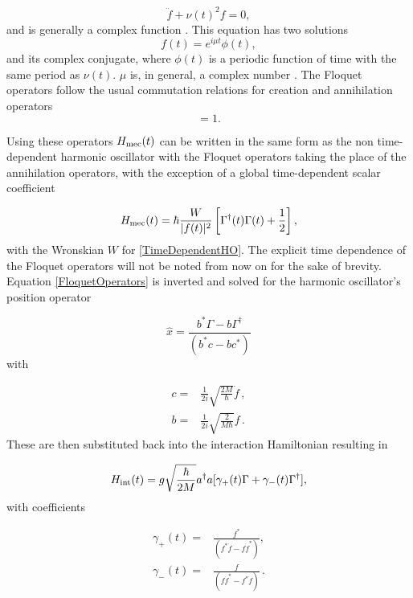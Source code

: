 \documentclass[reprint, amsmath,amssymb, aps,pra]{revtex4-1}
\begin{document}
\begin{equation} \label{TimeDependentHO}
\ddot{f} + \nu(t)^2f=0,
\end{equation} and is generally a complex function \cite{BrownPT}. This equation has two solutions \cite{HanngiFM} 
\begin{equation}
f(t) = e^{i\mu t}\phi(t), 
\end{equation}
and its complex conjugate, where $\phi(t)$ is a periodic function of
time with the same period as $\nu(t)$. $\mu$ is, in general, a complex
number \cite{WardFT}. The Floquet operators follow the usual
commutation relations for creation and annihilation operators
\begin{equation}
[\Gamma(t)^\dagger,\Gamma(t)]=1.
\end{equation}

 Using these operators $H_{\rm mec}(t)$ can be written in the same form as the non time-dependent harmonic oscillator with the Floquet operators taking the place of the annihilation operators, with the exception of a global time-dependent scalar coefficient  \cite{BrownPT}

\begin{equation}
H_{\rm mec}(t) = \hbar\frac{W}{|f(t)|^2}\left[\Gamma^\dagger(t)\Gamma(t) + \frac{1}{2}\right],
\end{equation}
with the Wronskian $W$ for \eqref{TimeDependentHO}. The explicit time dependence of the Floquet operators will not be noted from now on for the sake of brevity. Equation
\eqref{FloquetOperators} is inverted and solved for the harmonic
oscillator's position operator \cite{TesisMaestria}

\begin{equation}
\hat{x} = \frac{b^* \Gamma - b\Gamma^\dagger}{(b^*c-bc^*)}
\end{equation} with

\begin{align}
c =&  \frac{1}{2i}\sqrt{\frac{2M}{\hbar}}\dot{f}\, , \\
b =&  \frac{1}{2i}\sqrt{\frac{2}{M\hbar}}f\, .
\end{align}
These are then substituted back into the interaction Hamiltonian
resulting in

\begin{equation}
H_{\rm int}(t) = g\sqrt{\frac{\hbar}{2M}}a^\dagger a[\gamma_+(t)\Gamma +\gamma_-(t)\Gamma^\dagger],
\end{equation} with coefficients

\begin{align*}
\gamma_+(t)=&\frac{f^*}{(f^*\dot{f}-f\dot{f}^*)},\\
\gamma_-(t)=&\frac{f}{(f\dot{f}^*-f^*\dot{f})}\, .
\end{align*} 
\end{document}
